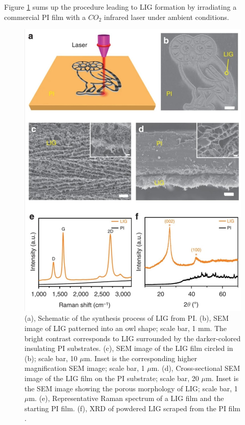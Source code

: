 Figure \ref{fig:LIN-2015} sums up the procedure leading to LIG formation by irradiating a commercial PI film with a $CO_2$ infrared laser under ambient conditions.

\begin{figure}[H]
\centering
\includegraphics[width=1\textwidth]{Figures/Theory/LIN-2014.jpg}
\medskip
\caption{(a), Schematic of the synthesis process of LIG from PI. (b), SEM image of LIG patterned into an owl shape; scale bar, 1 mm. The bright contrast corresponds to LIG surrounded by the darker-colored insulating PI substrates. (c), SEM image of the LIG film circled in (b); scale bar, 10 $\mu$m. Inset is the corresponding higher magnification SEM image; scale bar, 1 $\mu$m. (d), Cross-sectional SEM image of the LIG film on the PI substrate; scale bar, 20 $\mu$m. Inset is the SEM image showing the porous morphology of LIG; scale bar, 1 $\mu$m. (e), Representative Raman spectrum of a LIG film and the starting PI film. (f), XRD of powdered LIG scraped from the PI film \cite{lin_laser-induced_2014}.}
\label{fig:LIN-2015}
\end{figure}

